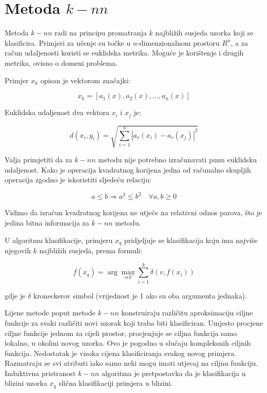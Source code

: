 \documentclass[12pt,a4paper]{ReportAA}
\begin{document}
\section{Metoda $k-nn$}


Metoda $k-nn$ radi na principu promatranja $k$ najbližih susjeda uzorka koji se klasificira.
Primjeri za učenje su točke u $n$-dimenzionalnom prostoru $R^{n}$, a za račun udaljenosti koristi se
euklidska metrika. Moguće je korištenje i drugih metrika, ovisno o domeni problema.

Primjer $x_k$ opisan je vektorom značajki:

\begin{equation}
x_k = [a_1(x), a_2(x), ..., a_n(x)]
\end{equation}


Euklidska udaljenost dva vektora $x_i$ i $x_j$ je:

\begin{equation}
d(x_i, y_i) = \sqrt{\sum_{i=1}^n |a_r(x_i) - a_r(x_j)|^2}
\end{equation}

Valja primjetiti da za $k-nn$ metodu nije potrebno izračunavati punu euklidsku udaljenost. Kako je operacija kvadratnog korijena
jedna od računalno skupljih operacija zgodno je iskoristiti sljedeću relaciju:

\begin{equation}
a \leq b \Rightarrow a^2 \leq b^2 \quad \forall a,b \geq 0
\end{equation}

Vidimo da izračun kvadratnog korijena ne utječe na relativni odnos parova, što je jedina bitna informacija za $k-nn$ metodu.

U algoritmu klasifikacije, primjeru $x_q$ pridjeljuje se klasifikacija koju ima najviše njegovih $k$ najbližih
susjeda, prema formuli:

\begin{equation}
f(x_q)=\arg\max_{v \epsilon V} \sum_{i=1}^k \delta(v,f(x_i))
\end{equation}

gdje je $\delta$ kroneckerov simbol (vrijednost je 1 ako su oba argumenta jednaka).


Lijene metode poput metode $k-nn$ konstruiraju različitu aproksimaciju ciljne funkcije za svaki različiti novi uzorak koji
traba biti klasificiran. Umjesto procjene ciljne funkcije jednom za cijeli prostor,
procjenjuje se ciljna funkcija samo lokalno, u okolini novog uzorka. Ovo je pogodno u slučaju
kompleksnih ciljnih funkcija. Nedostatak je visoka cijena klasificiranja svakog novog primjera. Razmatraju se svi atributi
iako samo neki mogu imati utjecaj na ciljnu funkciju. Induktivna pristranost $k-nn$ algoritma je pretpostavka da je klasifikacija
u blizini uzorka $x_q$ slična klasifikaciji primjera u blizini.
\end{document}
